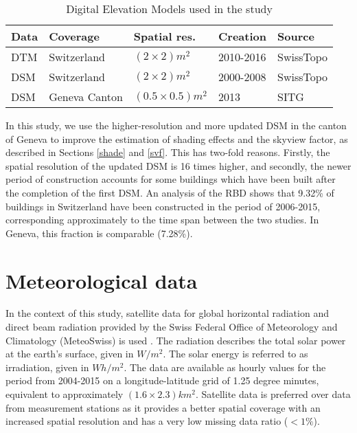 \begin{table}[b]
\centering
\footnotesize
\begin{tabular} {lllll} %
\hline
\textbf{Data} & \textbf{Coverage} & \textbf{Spatial res.} & \textbf{Creation} & \textbf{Source}\\
\hline 
DTM  & Switzerland & $(2\times2) m^2$ & 2010-2016 & SwissTopo \cite{swisstopo_swissalti3d_2017} \\
DSM  & Switzerland & $(2\times2) m^2$ & 2000-2008 & SwissTopo \cite{swisstopo_dsm_2005} \\
DSM  & Geneva Canton & $(0.5\times0.5) m^2$ & 2013 & SITG \cite{sitg_mns_2018} \\
\hline
\end{tabular}
\caption{Digital Elevation Models used in the study}
\label{tab:surface}
\end{table}

In this study, we use the higher-resolution and more updated DSM in the canton of Geneva to improve the estimation of shading effects and the skyview factor, as described in Sections \ref{shade} and \ref{svf}. This has two-fold reasons. Firstly, the spatial resolution of the updated DSM is 16 times higher, and secondly, the newer period of construction accounts for some buildings which have been built after the completion of the first DSM. An analysis of the RBD shows that 9.32\% of buildings in Switzerland have been constructed in the period of 2006-2015, corresponding approximately to the time span between the two studies. In Geneva, this fraction is comparable (7.28\%).


\section{Meteorological data}

In the context of this study, satellite data for global horizontal radiation and direct beam radiation provided by the Swiss Federal Office of Meteorology and Climatology (MeteoSwiss) is used \cite{stockli_heliomont_2017}. The radiation describes the total solar power at the earth's surface, given in $W/m^2$. The solar energy is referred to as irradiation, given in $Wh/m^2$. The data are available as hourly values for the period from 2004-2015 on a longitude-latitude grid of 1.25 degree minutes, equivalent to approximately $(1.6 \times 2.3)km^2$. Satellite data is preferred over data from measurement stations as it provides a better spatial coverage with an increased spatial resolution and has a very low missing data ratio ($<1\%$).


